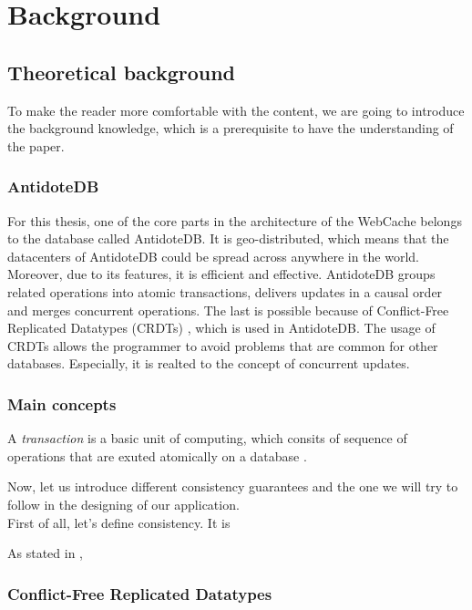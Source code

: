 \chapter{Background}
\label{Background}

\section{Theoretical background}

To make the reader more comfortable with the content, we are going to introduce the background knowledge, which is a prerequisite to have the understanding of the paper.

\subsection{AntidoteDB}

For this thesis, one of the core parts in the architecture of the WebCache belongs to the database called AntidoteDB\cite{4}. It is geo-distributed, which means that the datacenters of AntidoteDB could be spread across anywhere in the world. Moreover, due to its features, it is efficient and effective. AntidoteDB groups related operations into atomic transactions\cite{9}, delivers updates in a causal order and merges concurrent operations. The last is possible because of Conflict-Free Replicated Datatypes (CRDTs) \cite{2}, which is used in AntidoteDB. The usage of CRDTs allows the programmer to avoid problems that are common for other databases. Especially, it is realted to the concept of concurrent updates.

\subsection{Main concepts}

A \textit{transaction} is a basic unit of computing, which consits of sequence of operations that are exuted atomically on a database \cite{11}.

Now, let us introduce different consistency guarantees and the one we will try to follow in the designing of our application. 
\\
First of all, let's define consistency. It is 



As stated in \citet{10}, 



\subsection{Conflict-Free Replicated Datatypes}

